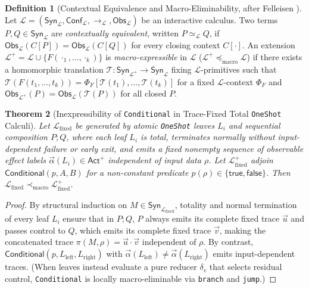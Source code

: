 \documentclass[11pt,a4paper]{article}
\newtheorem{theorem}{Theorem}[section]
\theoremstyle{definition}
\newtheorem{definition}[theorem]{Definition}
\theoremstyle{remark}
\newcommand{\Act}{\mathsf{Act}}
\newcommand{\Obs}{\mathsf{Obs}}
\newcommand{\Conf}{\mathsf{Conf}}
\begin{document}
\begin{definition}[Contextual Equivalence and Macro-Eliminability, after Felleisen \cite{felleisen1991expressive}]
Let $\mathcal{L} = (\mathsf{Syn}_{\mathcal{L}}, \Conf_{\mathcal{L}}, \longrightarrow_{\mathcal{L}}, \Obs_{\mathcal{L}})$ be an interactive calculus. Two terms $P, Q \in \mathsf{Syn}_{\mathcal{L}}$ are \emph{contextually equivalent}, written $P \simeq_{\mathcal{L}} Q$, if $\Obs_{\mathcal{L}}(C[P]) = \Obs_{\mathcal{L}}(C[Q])$ for every closing context $C[\cdot]$. An extension $\mathcal{L}^+ = \mathcal{L} \cup \{F(\cdot_1, \dots, \cdot_k)\}$ is \emph{macro-expressible} in $\mathcal{L}$ ($\mathcal{L}^+ \preceq_{\text{macro}} \mathcal{L}$) if there exists a homomorphic translation $\mathcal{T} : \mathsf{Syn}_{\mathcal{L}^+} \to \mathsf{Syn}_{\mathcal{L}}$ fixing $\mathcal{L}$-primitives such that $\mathcal{T}(F(t_1,\dots,t_k)) = \Phi_F[\mathcal{T}(t_1),\dots,\mathcal{T}(t_k)]$ for a fixed $\mathcal{L}$-context $\Phi_F$ and $\Obs_{\mathcal{L}^+}(P) = \Obs_{\mathcal{L}}(\mathcal{T}(P))$ for all closed $P$.
\end{definition}

\begin{theorem}[Inexpressibility of \texttt{Conditional} in Trace-Fixed Total \texttt{OneShot} Calculi]
\label{thm:oneshot}
Let $\mathcal{L}_{\text{fixed}}$ be generated by atomic \texttt{OneShot} leaves $L_i$ and sequential composition $P ; Q$, where each leaf $L_i$ is total, terminates normally without input-dependent failure or early exit, and emits a fixed nonempty sequence of observable effect labels $\vec{\alpha}(L_i) \in \Act^+$ independent of input data $\rho$. Let $\mathcal{L}_{\text{fixed}}^+$ adjoin $\mathsf{Conditional}(p, A, B)$ for a non-constant predicate $p(\rho) \in \{\mathsf{true}, \mathsf{false}\}$. Then $\mathcal{L}_{\text{fixed}} \prec_{\text{macro}} \mathcal{L}_{\text{fixed}}^+$.
\end{theorem}
\begin{proof}
By structural induction on $M \in \mathsf{Syn}_{\mathcal{L}_{\text{fixed}}}$, totality and normal termination of every leaf $L_i$ ensure that in $P ; Q$, $P$ always emits its complete fixed trace $\vec{u}$ and passes control to $Q$, which emits its complete fixed trace $\vec{v}$, making the concatenated trace $\pi(M, \rho) = \vec{u}\cdot\vec{v}$ independent of $\rho$. By contrast, $\mathsf{Conditional}(p, L_{\text{left}}, L_{\text{right}})$ with $\vec{\alpha}(L_{\text{left}}) \ne \vec{\alpha}(L_{\text{right}})$ emits input-dependent traces. (When leaves instead evaluate a pure reducer $\delta_v$ that selects residual control, \texttt{Conditional} is locally macro-eliminable via \texttt{branch} and \texttt{jump}.)
\end{proof}
\end{document}
